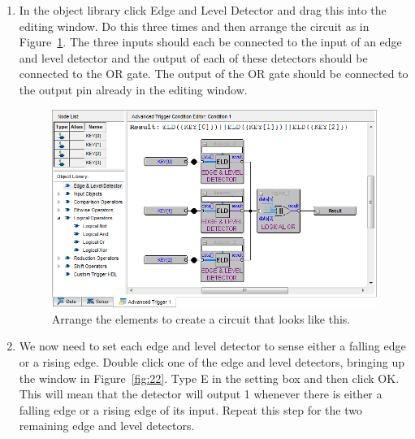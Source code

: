 \documentclass[11pt, twoside, pdftex]{article}
\begin{document}
\begin{enumerate}
\item In the object library click {\sf Edge and Level Detector} and drag this into the editing window. Do this three times and then arrange
the circuit as in Figure~\ref{fig:21}. The three inputs should each be connected to the input of an edge and level detector and the 
output of each of these detectors should be connected to the OR gate. The output of the OR gate should 
be connected to the output pin already in the editing window.
  
\begin{figure}[H]
   \begin{center}
      \includegraphics[scale=0.65]{figures/figure21.png}
   \caption{Arrange the elements to create a circuit that looks like this.} 
	 \label{fig:21}
	 \end{center}
\end{figure}

\item We now need to set each edge and level detector to sense either a falling edge or a rising edge. 
Double click one of the edge and level detectors,
bringing up the window in Figure~\ref{fig:22}. Type E in the setting box and then click {\sf OK}. This will mean that the detector will output 1 whenever
there is either a falling edge or a rising edge of its input. Repeat this step for the two remaining edge and level detectors.


\end{enumerate}
\end{document}
